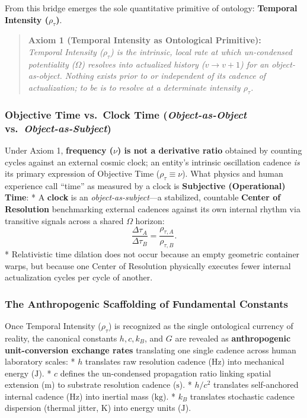 \documentclass[
]{article}
\begin{document}
From this bridge emerges the sole quantitative primitive of ontology:
\textbf{Temporal Intensity (\(\rho_\tau\))}.

\begin{quote}
\textbf{Axiom 1 (Temporal Intensity as Ontological Primitive):}\\
\emph{Temporal Intensity (\(\rho_\tau\)) is the intrinsic, local rate at
which un-condensed potentiality (\(\Omega\)) resolves into actualized
history (\(v \to v + 1\)) for an object-as-object. Nothing exists prior
to or independent of its cadence of actualization; to be is to resolve
at a determinate intensity \(\rho_\tau\).}
\end{quote}

\subsubsection{\texorpdfstring{Objective Time vs.~Clock Time
(\emph{Object-as-Object}
vs.~\emph{Object-as-Subject})}{Objective Time vs.~Clock Time (Object-as-Object vs.~Object-as-Subject)}}\label{objective-time-vs.-clock-time-object-as-object-vs.-object-as-subject}

Under Axiom 1, \textbf{frequency (\(\nu\)) is not a derivative ratio}
obtained by counting cycles against an external cosmic clock; an
entity's intrinsic oscillation cadence \emph{is} its primary expression
of Objective Time (\(\rho_\tau \equiv \nu\)). What physics and human
experience call ``time'' as measured by a clock is \textbf{Subjective
(Operational) Time}: * A \textbf{clock} is an
\emph{object-as-subject}---a stabilized, countable \textbf{Center of
Resolution} benchmarking external cadences against its own internal
rhythm via transitive signals across a shared \(\Omega\) horizon:
\[\frac{\Delta\tau_A}{\Delta\tau_B} = \frac{\rho_{\tau,A}}{\rho_{\tau,B}}.\]
* Relativistic time dilation does not occur because an empty geometric
container warps, but because one Center of Resolution physically
executes fewer internal actualization cycles per cycle of another.

\subsubsection{The Anthropogenic Scaffolding of Fundamental
Constants}\label{the-anthropogenic-scaffolding-of-fundamental-constants}

Once Temporal Intensity (\(\rho_\tau\)) is recognized as the single
ontological currency of reality, the canonical constants \(h, c, k_B\),
and \(G\) are revealed as \textbf{anthropogenic unit-conversion exchange
rates} translating one single cadence across human laboratory scales: *
\textbf{\(h\)} translates raw resolution cadence (\(\text{Hz}\)) into
mechanical energy (\(\text{J}\)). * \textbf{\(c\)} defines the
un-condensed propagation ratio linking spatial extension (\(\text{m}\))
to substrate resolution cadence (\(\text{s}\)). * \textbf{\(h/c^2\)}
translates self-anchored internal cadence (\(\text{Hz}\)) into inertial
mass (\(\text{kg}\)). * \textbf{\(k_B\)} translates stochastic cadence
dispersion (thermal jitter, \(\text{K}\)) into energy units
(\(\text{J}\)).
\end{document}
